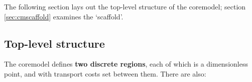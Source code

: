 The following section lays out the top-level structure of the \gls{coremodel}; section \ref{sec:cmscaffold} examines the `scaffold'.

\subsection{Top-level structure \label{sec:cmtoplevelstructure}}

The \gls{coremodel} defines \textbf{two discrete regions}, each of which is a dimensionless point, and with transport costs set between them. There are also:

